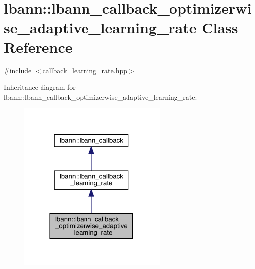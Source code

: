 \hypertarget{classlbann_1_1lbann__callback__optimizerwise__adaptive__learning__rate}{}\section{lbann\+:\+:lbann\+\_\+callback\+\_\+optimizerwise\+\_\+adaptive\+\_\+learning\+\_\+rate Class Reference}
\label{classlbann_1_1lbann__callback__optimizerwise__adaptive__learning__rate}


{\ttfamily \#include $<$callback\+\_\+learning\+\_\+rate.\+hpp$>$}



Inheritance diagram for lbann\+:\+:lbann\+\_\+callback\+\_\+optimizerwise\+\_\+adaptive\+\_\+learning\+\_\+rate\+:\nopagebreak
\begin{figure}[H]
\begin{center}
\leavevmode
\includegraphics[width=206pt]{classlbann_1_1lbann__callback__optimizerwise__adaptive__learning__rate__inherit__graph}
\end{center}
\end{figure}


